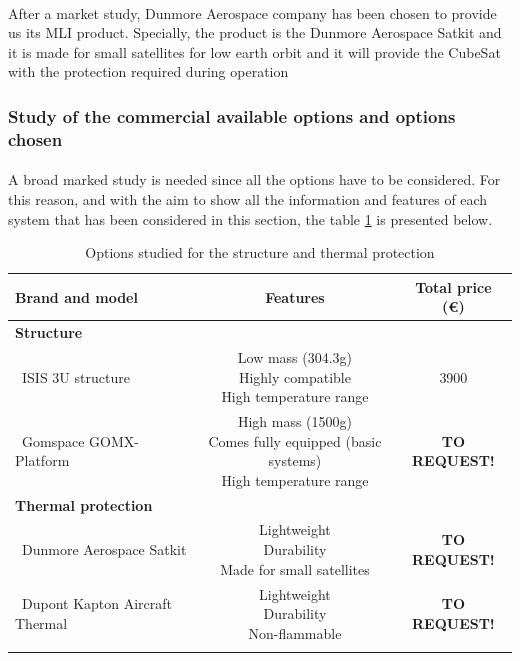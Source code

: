\paragraph{} 
After a market study, Dunmore Aerospace company has been chosen to provide us its MLI product. Specially, the product is the Dunmore Aerospace Satkit and it is made for small satellites for low earth orbit and it will provide the CubeSat with the protection required during operation

\subsubsection{Study of the commercial available options and options chosen}
\paragraph{}A broad marked study is needed since all the options have to be considered. For this reason, and with the aim to show all the information and features of each system that has been considered in this section, the table \ref{structureoptions} is presented below.


\begin{longtable}{| l | c | c | }
\hline
\rowcolor[gray]{0.80}	\textbf{Brand and model} &  \textbf{Features}     & \textbf{Total price (\euro)}   \\
\hline
\endfirsthead

\rowcolor[gray]{0.85} \textbf{Structure} &  &  \\
	   ~ISIS 3U structure & \makecell{Low mass (304.3g) \\ Highly compatible \\ High temperature range} & 3900 \\
	   \hline
	   ~Gomspace GOMX-Platform & \makecell{High mass (1500g) \\ Comes fully equipped (basic systems) \\ High temperature range} & \textbf{TO REQUEST!} \\
	   \hline
\rowcolor[gray]{0.85} \textbf{Thermal protection} &  &  \\
	   ~Dunmore Aerospace Satkit & \makecell{Lightweight \\ Durability \\ Made for small satellites}& \textbf{TO REQUEST!} \\
	   \hline
	   ~Dupont Kapton Aircraft Thermal & \makecell{Lightweight \\ Durability \\ Non-flammable} & \textbf{TO REQUEST!} \\
	\hline

\caption{Options studied for the structure and thermal protection}
\label{structureoptions}
\end{longtable}

